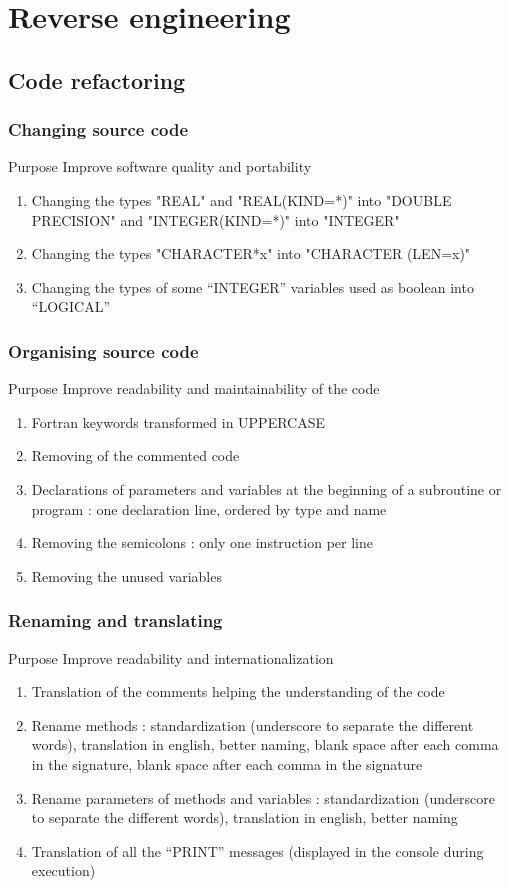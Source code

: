 \documentclass[10p]{beamer}
\begin{document}
\section{Reverse engineering}
\subsection{Code refactoring}
\begin{frame}
\frametitle{Changing source code}
\begin{block}{Purpose}
Improve software quality and portability
\end{block}
\begin{enumerate}
\item Changing the types "REAL" and "REAL(KIND=*)" into "DOUBLE PRECISION" and "INTEGER(KIND=*)" into "INTEGER"
\item Changing the types "CHARACTER*x" into "CHARACTER (LEN=x)"
\item Changing the types of some “INTEGER” variables used as boolean into “LOGICAL”
\end{enumerate}
\end{frame}
\begin{frame}
\frametitle{Organising source code}
\begin{block}{Purpose}
Improve readability and maintainability of the code
\end{block}
\begin{enumerate}
\item Fortran keywords transformed in UPPERCASE
\item Removing of the commented code
\item Declarations of parameters and variables at the beginning of a subroutine or program : one declaration line, ordered by type and name
\item Removing the semicolons : only one instruction per line
\item Removing the unused variables
\end{enumerate}
\end{frame}
\begin{frame}
\frametitle{Renaming and translating}
\begin{block}{Purpose}
Improve readability and internationalization
\end{block}
\begin{enumerate}
\item Translation of the comments helping the understanding of the code
\item Rename methods : standardization (underscore to separate the different words), translation in english, better naming, blank space after each comma in the signature, blank space after each comma in the signature
\item Rename parameters of methods and variables : standardization (underscore to separate the different words), translation in english, better naming
\item Translation of all the “PRINT” messages (displayed in the console during execution)
\end{enumerate}
\end{frame}
\end{document}
